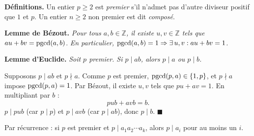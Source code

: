 ﻿%



\begin{tcolorbox}[thmbox]
  \textbf{Définitions.}\enspace%
  Un entier $p \geq 2$ est \emph{premier} s'il n'admet pas d'autre diviseur
  positif que $1$ et $p$.
  Un entier $n \geq 2$ non premier est dit \emph{composé}.

  \medskip
  \textbf{Lemme de Bézout.}\enspace{}
  \textit{Pour tous $a, b \in \mathbb{Z}$, il existe $u, v \in \mathbb{Z}$ tels que}
  $au + bv = \operatorname{pgcd}(a,b)$.
  \textit{En particulier, $\operatorname{pgcd}(a,b) = 1 \Rightarrow \exists\,u,v : au+bv=1$.}

  \medskip
  \textbf{Lemme d'Euclide.}\enspace{}
  \textit{Soit $p$ premier. Si $p \mid ab$, alors $p \mid a$ ou $p \mid b$.}
\end{tcolorbox}


\begin{mdframed}[style=proofbar]
  Supposons $p \mid ab$ et $p \nmid a$. Comme $p$ est premier, $\operatorname{pgcd}(p,a) \in \{1,p\}$,
  et $p \nmid a$ impose $\operatorname{pgcd}(p,a)=1$. Par Bézout, il existe $u,v$ tels que
  $pu + av = 1$. En multipliant par $b$ :
  \[
    pub + avb = b.
  \]
  $p \mid pub$ (car $p \mid p$) et $p \mid avb$ (car $p \mid ab$), donc $p \mid b$.
  $\blacksquare$
\end{mdframed}

Par récurrence : si $p$ est premier et $p \mid a_1 a_2 \cdots a_k$,
alors $p \mid a_i$ pour au moins un $i$.

\decsep{}


